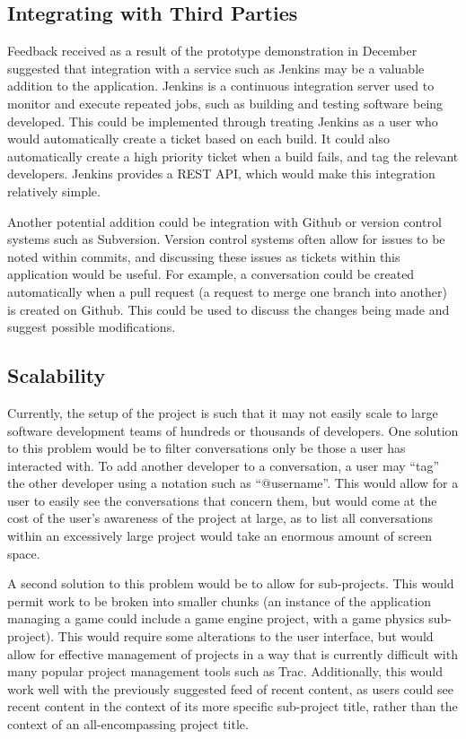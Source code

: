 \documentclass[a4paper]{l3proj}
\begin{document}
\subsection{Integrating with Third Parties}
\label{integration}
Feedback received as a result of the prototype demonstration in December suggested that integration with a service such as Jenkins may be a valuable addition to the application. Jenkins \cite{site:jenkins}is a continuous integration server used to monitor and execute repeated jobs, such as building and testing software being developed.  This could be implemented through treating Jenkins as a user who would automatically create a ticket based on each build.  It could also automatically create a high priority ticket when a build fails, and tag the relevant developers.  Jenkins provides a REST API, which would make this integration relatively simple.

Another potential addition could be integration with Github or version control systems such as Subversion. Version control systems often allow for issues to be noted within commits, and discussing these issues as tickets within this application would be useful.  For example, a conversation could be created automatically when a pull request (a request to merge one branch into another) is created on Github.  This could be used to discuss the changes being made and suggest possible modifications.

\subsection{Scalability}
\label{scalability}

Currently, the setup of the project is such that it may not easily scale to large software development teams of hundreds or thousands of developers. 
One solution to this problem would be to filter conversations only be those a user has interacted with. To add another developer to a conversation, a user may “tag” the other developer using a notation such as “@username”. This would allow for a user to easily see the conversations that concern them, but would come at the cost of the user’s awareness of the project at large, as to list all conversations within an excessively large project would take an enormous amount of screen space. 

A second solution to this problem would be to allow for sub-projects. This would permit work to be broken into smaller chunks (an instance of the application managing a game could include a game engine project, with a game physics sub-project). This would require some alterations to the user interface, but would allow for effective management of projects in a way that is currently difficult with many popular project management tools such as Trac. Additionally, this would work well with the previously suggested feed of recent content, as users could see recent content in the context of its more specific sub-project title, rather than the context of an all-encompassing project title. 
\end{document}

